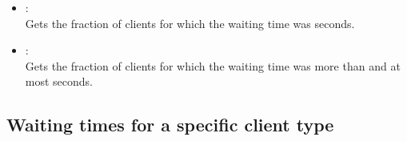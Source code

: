 \begin{itemize}
\item
{}:\\
Gets the fraction of clients for which the waiting time was  seconds.

\item
{}:\\
Gets the fraction of clients for which the waiting time was more than  and at most  seconds.

\end{itemize}  



\subsection{Waiting times for a specific client type}

